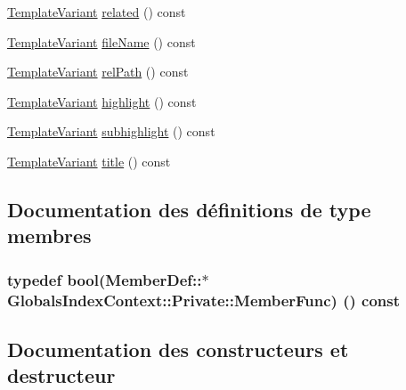 \begin{DoxyCompactItemize}
\item 
\hyperlink{class_template_variant}{Template\+Variant} \hyperlink{class_globals_index_context_1_1_private_a1d37569cff9f3cfe72b0f1baf957c290}{related} () const 
\item 
\hyperlink{class_template_variant}{Template\+Variant} \hyperlink{class_globals_index_context_1_1_private_a6f0361a9bd3efc57754b10d998a700a3}{file\+Name} () const 
\item 
\hyperlink{class_template_variant}{Template\+Variant} \hyperlink{class_globals_index_context_1_1_private_ac4ddb88fe0dbc77d44a29a70cf94849c}{rel\+Path} () const 
\item 
\hyperlink{class_template_variant}{Template\+Variant} \hyperlink{class_globals_index_context_1_1_private_aa627f4bac8ef1c6d6da81e860ae5e1e6}{highlight} () const 
\item 
\hyperlink{class_template_variant}{Template\+Variant} \hyperlink{class_globals_index_context_1_1_private_aa14f6c6139cd57ea9902dd1d3659fda5}{subhighlight} () const 
\item 
\hyperlink{class_template_variant}{Template\+Variant} \hyperlink{class_globals_index_context_1_1_private_acaeba1648aee41c25bbf11cbf0485486}{title} () const 
\end{DoxyCompactItemize}


\subsection{Documentation des définitions de type membres}
\hypertarget{class_globals_index_context_1_1_private_a8d7afa38481f112522b6a0df12c98592}{}
\subsubsection[{Member\+Func}]{\setlength{\rightskip}{0pt plus 5cm}typedef {\bf bool}(Member\+Def\+::$\ast$ Globals\+Index\+Context\+::\+Private\+::\+Member\+Func) () const }\label{class_globals_index_context_1_1_private_a8d7afa38481f112522b6a0df12c98592}


\subsection{Documentation des constructeurs et destructeur}
\hypertarget{class_globals_index_context_1_1_private_ab0330573fa6ee6f909d527849cc7d454}{}
